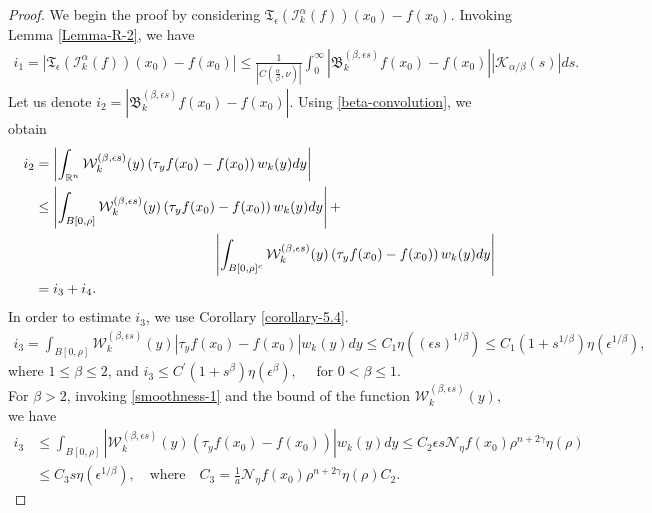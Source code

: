\documentclass[11pt,a4paper,reqno]{amsproc}
\theoremstyle{definition}
\theoremstyle{remark}
\numberwithin{equation}{section}
\begin{document}
\begin{proof}
We begin the proof by considering  $\mathfrak{T}_\epsilon(\mathcal{I}_k^{\alpha}(f))(x_0)- f(x_0)$. Invoking Lemma \ref{Lemma-R-2}, we have 
\begin{align} \label{m-eq0}
  i_1=  \left| \mathfrak{T}_\epsilon(\mathcal{I}_k^{\alpha}(f))(x_0)- f(x_0) \right| \leq \frac{1}{\left|C(\frac{\alpha}{\beta},\nu)\right|}\int_0^\infty \left|\mathfrak{B}_k^{(\beta, \epsilon s)}f(x_0)-f(x_0)\right| \left|\mathcal{K}_{\alpha/\beta}(s)\right|ds .
\end{align}
    Let us denote $i_2=| \mathfrak{B}_k^{(\beta, \epsilon s)}f(x_0)-f(x_0)|$. Using \eqref{beta-convolution}, we obtain
    \begin{align*}
        i_2 &= \left|\int_{\mathbb{R}^n} \mathcal{W}_k^{(\beta, \epsilon s)}(y) \left( \tau_yf(x_0)-f(x_0) \right)w_k(y)dy
        \right|\\
        &\leq \left|\int_{B[0,\rho]} \mathcal{W}_k^{(\beta, \epsilon s)} (y)\left( \tau_yf(x_0)-f(x_0) \right)w_k(y)dy
        \right| + \\ & \hspace{4.5cm}  \left|\int_{B[0,\rho]^c} \mathcal{W}_k^{(\beta, \epsilon s)}(y) \left( \tau_yf(x_0)-f(x_0) \right)w_k(y)dy
        \right|\\
        & = i_3 +i_4.
    \end{align*}
    In order to estimate $i_3$, we use Corollary \ref{corollary-5.4}. 
    \begin{align*}
      i_3=  \int_{B[0,\rho]} \mathcal{W}_k^{(\beta, \epsilon s)}(y) \left| \tau_yf(x_0)-f(x_0) \right|w_k(y)dy \leq C_1\eta((\epsilon s)^{1/\beta}) \leq C_1 (1+s^{1/\beta}) \eta (\epsilon^{1/\beta}),
    \end{align*} where $ 1\leq \beta \leq 2$,
    and $ i_3 \leq  C^\prime (1+s^{\beta}) \eta (\epsilon^{\beta}), \quad \text{ for $0< \beta \leq 1$. }$\\
\noindent  For $\beta > 2$, invoking \eqref{smoothness-1} and the bound of the function $ \mathcal{W}_k^{(\beta, \epsilon s)}(y), $ we have 
    \begin{align*}
        i_3 & \leq \int_{B[0,\rho]} \left|\mathcal{W}_k^{(\beta, \epsilon s)}(y) \left( \tau_yf(x_0)-f(x_0) \right) \right|w_k(y)dy 
         \leq C_2\epsilon s \mathcal{N}_{\eta}f(x_0) \rho^{n+2\gamma}\eta(\rho)\\ &\leq C_3s\eta(\epsilon^{1/\beta}), \quad \text{where} \quad C_3= \frac{1}{a} \mathcal{N}_\eta f(x_0)\rho^{n+2\gamma}\eta(\rho)C_2.
    \end{align*}


\end{proof}
\end{document}
